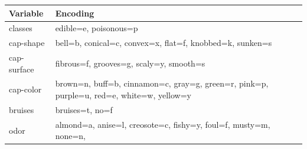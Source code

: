 \documentclass[
]{article}
\begin{document}
\begin{longtable}[]{@{}ll@{}}
\toprule
\begin{minipage}[b]{0.47\columnwidth}\raggedright
Variable\strut
\end{minipage} & \begin{minipage}[b]{0.47\columnwidth}\raggedright
Encoding\strut
\end{minipage}\tabularnewline
\midrule
\endhead
\begin{minipage}[t]{0.47\columnwidth}\raggedright
classes\strut
\end{minipage} & \begin{minipage}[t]{0.47\columnwidth}\raggedright
edible=e, poisonous=p\strut
\end{minipage}\tabularnewline
\begin{minipage}[t]{0.47\columnwidth}\raggedright
cap-shape\strut
\end{minipage} & \begin{minipage}[t]{0.47\columnwidth}\raggedright
bell=b, conical=c, convex=x, flat=f, knobbed=k, sunken=s\strut
\end{minipage}\tabularnewline
\begin{minipage}[t]{0.47\columnwidth}\raggedright
cap-surface\strut
\end{minipage} & \begin{minipage}[t]{0.47\columnwidth}\raggedright
fibrous=f, grooves=g, scaly=y, smooth=s\strut
\end{minipage}\tabularnewline
\begin{minipage}[t]{0.47\columnwidth}\raggedright
cap-color\strut
\end{minipage} & \begin{minipage}[t]{0.47\columnwidth}\raggedright
brown=n, buff=b, cinnamon=c, gray=g, green=r, pink=p, purple=u, red=e,
white=w, yellow=y\strut
\end{minipage}\tabularnewline
\begin{minipage}[t]{0.47\columnwidth}\raggedright
bruises\strut
\end{minipage} & \begin{minipage}[t]{0.47\columnwidth}\raggedright
bruises=t, no=f\strut
\end{minipage}\tabularnewline
\begin{minipage}[t]{0.47\columnwidth}\raggedright
odor\strut
\end{minipage} & \begin{minipage}[t]{0.47\columnwidth}\raggedright
almond=a, anise=l, creosote=c, fishy=y, foul=f, musty=m, none=n,

\end{minipage}
\end{longtable}
\end{document}
